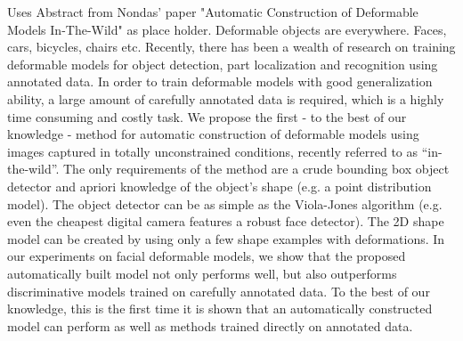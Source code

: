 Uses Abstract from Nondas' paper "Automatic Construction of Deformable Models In-The-Wild" as place holder. 
Deformable objects are everywhere. Faces, cars, bicycles,
chairs etc. Recently, there has been a wealth of research
on training deformable models for object detection,
part localization and recognition using annotated data. In
order to train deformable models with good generalization
ability, a large amount of carefully annotated data is required,
which is a highly time consuming and costly task.
We propose the first - to the best of our knowledge - method
for automatic construction of deformable models using images
captured in totally unconstrained conditions, recently
referred to as “in-the-wild”. The only requirements of the
method are a crude bounding box object detector and apriori
knowledge of the object’s shape (e.g. a point distribution
model). The object detector can be as simple as the
Viola-Jones algorithm (e.g. even the cheapest digital camera
features a robust face detector). The 2D shape model
can be created by using only a few shape examples with deformations.
In our experiments on facial deformable models,
we show that the proposed automatically built model
not only performs well, but also outperforms discriminative
models trained on carefully annotated data. To the best of
our knowledge, this is the first time it is shown that an automatically
constructed model can perform as well as methods
trained directly on annotated data.